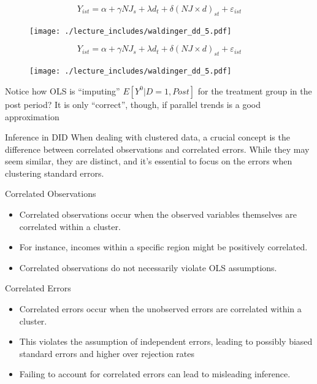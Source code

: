 \documentclass{beamer}
\begin{document}
\begin{frame}[plain]
	$$Y_{ist} = \alpha + \gamma NJ_s + \lambda d_t + \delta(NJ\times d)_{st} + \varepsilon_{ist}$$
	\begin{figure}
	\texttt{[image: ./lecture\_includes/waldinger\_dd\_5.pdf]}
	\end{figure}
\end{frame}


\begin{frame}[plain]
	$$Y_{ist} = \alpha + \gamma NJ_s + \lambda d_t + \delta(NJ\times d)_{st} + \varepsilon_{ist}$$
	\begin{figure}
	\texttt{[image: ./lecture\_includes/waldinger\_dd\_5.pdf]}
	\end{figure}

Notice how OLS is ``imputing'' $E[Y^0|D=1,Post]$ for the treatment group in the post period? It is only ``correct'', though, if parallel trends is a good approximation

\end{frame}


\begin{frame}{Inference in DID}
  When dealing with clustered data, a crucial concept is the difference between correlated observations and correlated errors. While they may seem similar, they are distinct, and it's essential to focus on the errors when clustering standard errors.
\end{frame}

\begin{frame}{Correlated Observations}
  \begin{itemize}
    \item Correlated observations occur when the observed variables themselves are correlated within a cluster.
    \item For instance, incomes within a specific region might be positively correlated.
    \item Correlated observations do not necessarily violate OLS assumptions.
  \end{itemize}
\end{frame}

\begin{frame}{Correlated Errors}
  \begin{itemize}
    \item Correlated errors occur when the unobserved errors are correlated within a cluster.
    \item This violates the assumption of independent errors, leading to possibly biased standard errors and higher over rejection rates
    \item Failing to account for correlated errors can lead to misleading inference.
  \end{itemize}
\end{frame}
\end{document}
